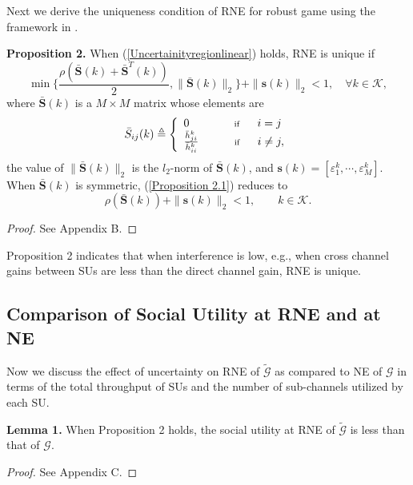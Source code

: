 \documentclass[peerreview,onecolumn,11pt,draftclsnofoot]{IEEEtran}\usepackage{amsmath}\usepackage{amsfonts}\usepackage{epsfig}\usepackage{amssymb}\usepackage{graphicx}\usepackage{amssymb,amsmath}\usepackage{cite}\usepackage{color,soul}\newcommand\T{\rule{0pt}{3.1ex}}
\begin{document}
Next we derive the uniqueness condition of RNE for robust game using the framework in \cite{Nash1}.

\textbf{Proposition 2.} When (\ref{Uncertainityregionlinear}) holds, RNE is unique if
\begin{equation}\label{Proposition 2.1}
   \!\! \min\{\frac{\rho(\bar{\textbf{S}}(k)+\bar{\textbf{S}}^{T}(k))}{2},\|\bar{\textbf{S}}(k)\|_2\}+\|\mathbf{s}(k)\|_2<1, \quad \forall k \in \mathcal{K},
\end{equation}
where $\bar{\textbf{S}}(k)$ is a $M \times M$ matrix whose elements are
\begin{eqnarray}\label{Proposition 2.3}
 \bar{S}_{ij}(k)\triangleq \left\{\begin{array}{l l}
0 \qquad\qquad \scriptsize{\textnormal{if}}
\qquad i=j \\
 \frac{\bar{h}^{k}_{ji}}{\bar{h}^{k}_{ii}} \qquad\quad\, \scriptsize{\textnormal{if}} \qquad i\neq j, \end{array} \right.
 \end{eqnarray}
the value of $\|\bar{\textbf{S}}(k)\|_2$ is the $l_2$-norm of $\bar{\textbf{S}}(k)$, and $\mathbf{s}(k)=[\varepsilon^{k}_1,\cdots,\varepsilon^{k}_M]$. When $\bar{\textbf{S}}(k)$ is symmetric, (\ref{Proposition 2.1}) reduces to
\begin{equation}\label{Proposition 2.2}
    \rho(\bar{\textbf{S}}(k))+\|\mathbf{s}(k)\|_2<1, \qquad k \in \mathcal{K}.
\end{equation}
\begin{proof}
See Appendix B.
\end{proof}
Proposition 2 indicates that when interference is low, e.g., when cross channel gains between SUs are less than the direct channel gain, RNE is unique.

\subsection{Comparison of Social Utility at RNE and at NE}

Now we discuss the effect of uncertainty on RNE of
$\widetilde{\mathcal{G}}$ as compared to NE of $\mathcal{G}$ in
terms of the total throughput of SUs and the number of
sub-channels utilized by each SU.

\textbf{Lemma 1.} When Proposition 2 holds, the social utility at RNE of $\widetilde{\mathcal{G}}$ is less than that of
$\mathcal{G}$.
\begin{proof}
See Appendix C.
\end{proof}
\end{document}

